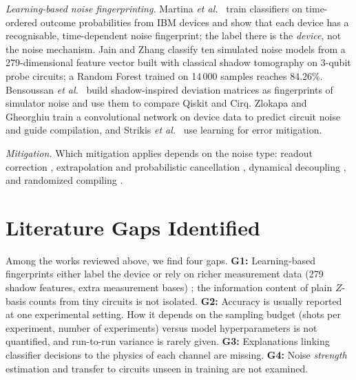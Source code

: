 \documentclass[conference]{IEEEtran}
\begin{document}
\emph{Learning-based noise fingerprinting.} Martina \emph{et al.}\ \cite{martina} train classifiers on time-ordered outcome probabilities from IBM devices and show that each device has a recognisable, time-dependent noise fingerprint; the label there is the \emph{device}, not the noise mechanism. Jain and Zhang \cite{jain} classify ten simulated noise models from a 279-dimensional feature vector built with classical shadow tomography on 3-qubit probe circuits; a Random Forest trained on 14\,000 samples reaches $84.26\%$. Bensoussan \emph{et al.}\ \cite{simshadow} build shadow-inspired deviation matrices as fingerprints of simulator noise and use them to compare Qiskit and Cirq. Zlokapa and Gheorghiu \cite{zlokapa} train a convolutional network on device data to predict circuit noise and guide compilation, and Strikis \emph{et al.}\ \cite{strikis} use learning for error mitigation.

\emph{Mitigation.} Which mitigation applies depends on the noise type: readout correction \cite{bravyi}, extrapolation and probabilistic cancellation \cite{temme}, dynamical decoupling \cite{viola}, and randomized compiling \cite{wallman}.

\section{Literature Gaps Identified}\label{sec:gaps}
Among the works reviewed above, we find four gaps. \textbf{G1:} Learning-based fingerprints either label the device \cite{martina} or rely on richer measurement data (279 shadow features, extra measurement bases) \cite{jain,simshadow}; the information content of plain $Z$-basis counts from tiny circuits is not isolated. \textbf{G2:} Accuracy is usually reported at one experimental setting. How it depends on the sampling budget (shots per experiment, number of experiments) versus model hyperparameters is not quantified, and run-to-run variance is rarely given. \textbf{G3:} Explanations linking classifier decisions to the physics of each channel are missing. \textbf{G4:} Noise \emph{strength} estimation and transfer to circuits unseen in training are not examined.

\end{document}
